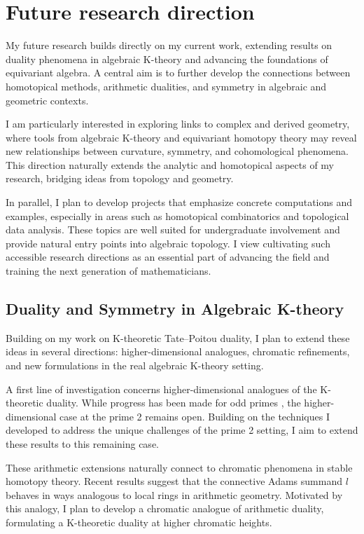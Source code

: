 \documentclass[11pt]{article}
\begin{document}
\section{Future research direction}
My future research builds directly on my current work, extending results on duality phenomena in algebraic K-theory and advancing the foundations of equivariant algebra. 
A central aim is to further develop the connections between homotopical methods, arithmetic dualities, and symmetry in algebraic and geometric contexts.

I am particularly interested in exploring links to complex and derived geometry, where tools from algebraic K-theory and equivariant homotopy theory may reveal new relationships between curvature, symmetry, and cohomological phenomena. 
This direction naturally extends the analytic and homotopical aspects of my research, bridging ideas from topology and geometry.

In parallel, I plan to develop projects that emphasize concrete computations and examples, especially in areas such as homotopical combinatorics and topological data analysis. 
These topics are well suited for undergraduate involvement and provide natural entry points into algebraic topology. 
I view cultivating such accessible research directions as an essential part of advancing the field and training the next generation of mathematicians.

\subsection*{Duality and Symmetry in Algebraic K-theory}
Building on my work on K-theoretic Tate–Poitou duality, I plan to extend these ideas in several directions: higher-dimensional analogues, chromatic refinements, and new formulations in the real algebraic K-theory setting.

A first line of investigation concerns higher-dimensional analogues of the K-theoretic duality.
While progress has been made for odd primes \cite{Braunling}, the higher-dimensional case at the prime 2 remains open.
Building on the techniques I developed to address the unique challenges of the prime 2 setting, I aim to extend these results to this remaining case.

These arithmetic extensions naturally connect to chromatic phenomena in stable homotopy theory.
Recent results \cite{HRW} suggest that the connective Adams summand $l$ behaves in ways analogous to local rings in arithmetic geometry.
Motivated by this analogy, I plan to develop a chromatic analogue of arithmetic duality, formulating a K-theoretic duality at higher chromatic heights.
\end{document}
